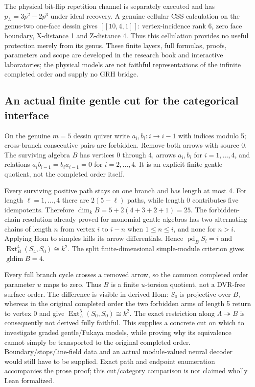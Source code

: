 \documentclass[11pt,oneside,openany]{book}
\theoremstyle{definition}\newtheorem{definition}[theorem]{Definition}
\theoremstyle{remark}\newtheorem{remark}[theorem]{Remark}
\begin{document}
The physical bit-flip repetition channel is separately executed and has
$ p_L=3 p^2-2 p^3$ under ideal recovery. A genuine cellular CSS calculation on
the genus-two one-face dessin gives $[[10,4,1]]$: vertex-incidence rank 6,
zero face boundary, X-distance 1 and Z-distance 4. Thus this cellulation
provides no useful protection merely from its genus. These finite layers,
full formulas, proofs, parameters and scope are developed in the research
book and interactive laboratories; the physical models are not faithful
representations of the infinite completed order and supply no GRH bridge.

\subsection{An actual finite gentle cut for the categorical interface}
\label{rg:cut}
On the genuine $ m=5$ dessin quiver write
$ a_i,b_i:i\to i-1$ with indices modulo 5; cross-branch consecutive pairs
are forbidden. Remove both arrows with source 0. The surviving algebra $ B $
has vertices 0 through 4, arrows $ a_i,b_i $ for $ i=1,\ldots,4$, and relations
$ a_i b_{i-1}=b_i a_{i-1}=0$ for $ i=2,\ldots,4$. It is an explicit finite
gentle quotient, not the completed order itself.

Every surviving positive path stays on one branch and has length at most 4.
For length $\ell=1,\ldots,4$ there are $2(5-\ell)$ paths, while length 0
contributes five idempotents. Therefore $\dim_kB=5+2(4+3+2+1)=25$.
The forbidden-chain resolution already proved for monomial gentle algebras
has two alternating chains of length $ n $ from vertex $ i $ to $ i-n $ when
$1\le n\le i $, and none for $ n>i $. Applying Hom to simples kills its
arrow differentials. Hence $\operatorname{pd}_B S_i=i $ and
$\operatorname{Ext}^4_B(S_4,S_0)\cong k^2$. The split finite-dimensional
simple-module criterion gives $\operatorname{gldim}B=4$.

Every full branch cycle crosses a removed arrow, so the common completed
order parameter $ u $ maps to zero. Thus $ B $ is a finite $ u $-torsion quotient,
not a DVR-free surface order. The difference is visible in derived Hom:
$ S_0$ is projective over $ B $, whereas in the original completed order the
two forbidden arms of length 5 return to vertex 0 and give
$\operatorname{Ext}^5_\Lambda(S_0,S_0)\cong k^2$. The exact restriction along
$\Lambda\twoheadrightarrow B $ is consequently not derived fully faithful.
This supplies a concrete cut on which to investigate graded gentle/Fukaya
models, while proving why its equivalence cannot simply be transported to
the original completed order. Boundary/stops/line-field data and an actual
module-valued neural decoder would still have to be supplied. Exact path
and endpoint enumeration accompanies the prose proof; this cut/category
comparison is not claimed wholly Lean formalized.
\end{document}
